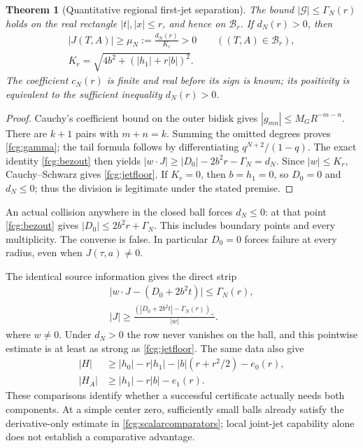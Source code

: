 \documentclass[11pt]{article}
\numberwithin{equation}{section}
\newtheorem{theorem}{Theorem}[section]
\begin{document}
\begin{theorem}[Quantitative regional first-jet separation]
\label{fcg:separation}
The bound $|\mathcal G|\le\Gamma_N(r)$ holds on the real rectangle
$|t|,|x|\le r$, and hence on $\mathcal B_r$. If $d_N(r)>0$, then
\begin{equation}\label{fcg:jetfloor}
 \begin{gathered}
 |J(T,A)|\ge\mu_N:=\frac{d_N(r)}{K_r}>0
       \qquad ((T,A)\in\mathcal B_r),\\
 K_r=\sqrt{4b^2+(|h_1|+r|b|)^2}.
 \end{gathered}
\end{equation}
The coefficient $c_N(r)$ is finite and real before its sign is known;
its positivity is equivalent to the sufficient inequality $d_N(r)>0$.
\end{theorem}
\begin{proof}
Cauchy's coefficient bound on the outer bidisk gives
$|g_{mn}|\le M_GR^{-m-n}$. There are $k+1$ pairs with $m+n=k$.
Summing the omitted degrees proves \eqref{fcg:gamma}; the tail formula
follows by differentiating $q^{N+2}/(1-q)$.
The exact identity \eqref{fcg:bezout} then yields
$|w\cdot J|\ge |D_0|-2b^2r-\Gamma_N=d_N$.
Since $|w|\le K_r$, Cauchy--Schwarz gives \eqref{fcg:jetfloor}.
If $K_r=0$, then $b=h_1=0$, so $D_0=0$ and $d_N\le0$;
thus the division is legitimate under the stated premise.
\end{proof}

An actual collision anywhere in the closed ball forces $d_N\le0$:
at that point \eqref{fcg:bezout} gives
$|D_0|\le2b^2r+\Gamma_N$. This includes boundary points and every
multiplicity. The converse is false. In particular $D_0=0$ forces
failure at every radius, even when $J(\tau,a)\ne0$.

The identical source information gives the direct strip
\begin{equation}\label{fcg:directstrip}
 \begin{gathered}
 \bigl|w\cdot J-(D_0+2b^2t)\bigr|\le\Gamma_N(r),\\
 |J|\ge\frac{(|D_0+2b^2t|-\Gamma_N(r))_+}{|w|}.
 \end{gathered}
\end{equation}
where $w\ne0$. Under $d_N>0$ the row never vanishes on the ball,
and this pointwise estimate is at least as strong as
\eqref{fcg:jetfloor}. The same data also give
\begin{align}
 |H|&\ge|h_0|-r|h_1|-|b|(r+r^2/2)-e_0(r),\nonumber\\
 |H_A|&\ge|h_1|-r|b|-e_1(r).\label{fcg:scalarcomparators}
\end{align}
These comparisons identify whether a successful certificate actually
needs both components. At a simple center zero, sufficiently small
balls already satisfy the derivative-only estimate in
\eqref{fcg:scalarcomparators}; local joint-jet capability alone does
not establish a comparative advantage.
\end{document}
